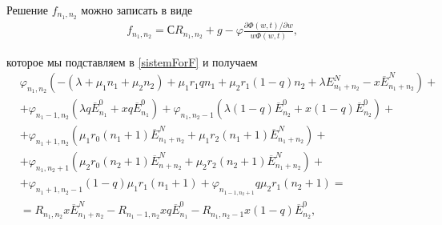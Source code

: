 Решение $f_{n_1, n_2}$ можно записать в виде \\
 \begin{equation}\label{solutionForF}
	\begin{split}
		&f_{n_{1}, n_{2}}=СR_{n_{1}, n_{2}}+g-\varphi\frac{\partial \Phi(w,t)/ \partial w}{w\Phi(w,t)},
	\end{split}
\end{equation}

которое мы подставляем в \eqref{sistemForF} и получаем
 \begin{equation*}
	\begin{split}
		&\varphi_{n_{1}, n_{2}}(-(\lambda +\mu_{1} n_{1}+\mu_{2} n_{2})+\mu_{1} r_{1} q n_{1}+ \mu_{2} r_{1} (1-q) n_{2} + \lambda E_{n_{1} + n_{2}}^{N} - x\overline{E}_{n_{1} + n_{2}}^{N})+\\
		&+\varphi_{n_{1}-1, n_{2}}(\lambda q \overline{E}_{n_{1}}^{0}+xq\overline{E}_{n_{1}}^{0})+\varphi_{n_{1}, n_{2}-1}(\lambda (1-q) \overline{E}_{n_{2}}^{0}+x(1-q)\overline{E}_{n_{2}}^{0})+\\
		&+\varphi_{n_{1}+1, n_{2}}(\mu_{1} r_{0}(n_{1}+1)\overline{E}_{n_{1} + n_{2}}^{N} + \mu_{1} r_{2}(n_{1}+1)\overline{E}_{n_{1} + n_{2}}^{N})+\\
		&+\varphi_{n_{1}, n_{2}+1}(\mu_{2} r_{0}(n_{2}+1)\overline{E}_{n_{} + n_{2}}^{N} + \mu_{2} r_{2}(n_{2}+1)\overline{E}_{n_{1} + n_{2}}^{N})+\\
		&+\varphi_{n_{1}+1, n_{2}-1}(1-q)\mu_{1} r_{1} (n_{1}+1)+\varphi_{n_{1-1, n_{2}+1}}q\mu_{2}r_{1}(n_{2}+1)=\\
		&=R_{n_{1}, n_{2}} x\overline{E}_{n_{1} + n_{2}}^{N}-R_{n_{1}-1, n_{2}}xq\overline{E}_{n_{1}}^{0}-R_{n_{1}, n_{2}-1}x(1-q)\overline{E}_{n_{2}}^{0},
	\end{split}
\end{equation*}
